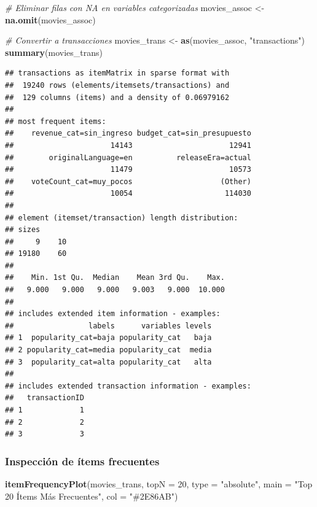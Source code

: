 \documentclass[
]{article}
\newenvironment{Shaded}{\begin{snugshade}}{\end{snugshade}}
\newcommand{\AttributeTok}[1]{\textcolor[rgb]{0.13,0.29,0.53}{#1}}
\newcommand{\CommentTok}[1]{\textcolor[rgb]{0.56,0.35,0.01}{\textit{#1}}}
\newcommand{\DecValTok}[1]{\textcolor[rgb]{0.00,0.00,0.81}{#1}}
\newcommand{\FunctionTok}[1]{\textcolor[rgb]{0.13,0.29,0.53}{\textbf{#1}}}
\newcommand{\NormalTok}[1]{#1}
\newcommand{\OtherTok}[1]{\textcolor[rgb]{0.56,0.35,0.01}{#1}}
\newcommand{\StringTok}[1]{\textcolor[rgb]{0.31,0.60,0.02}{#1}}
\begin{document}
\begin{Shaded}
\begin{Highlighting}[]
\CommentTok{\# Eliminar filas con NA en variables categorizadas}
\NormalTok{movies\_assoc }\OtherTok{\textless{}{-}} \FunctionTok{na.omit}\NormalTok{(movies\_assoc)}

\CommentTok{\# Convertir a transacciones}
\NormalTok{movies\_trans }\OtherTok{\textless{}{-}} \FunctionTok{as}\NormalTok{(movies\_assoc, }\StringTok{"transactions"}\NormalTok{)}
\FunctionTok{summary}\NormalTok{(movies\_trans)}
\end{Highlighting}
\end{Shaded}

\begin{verbatim}
## transactions as itemMatrix in sparse format with
##  19240 rows (elements/itemsets/transactions) and
##  129 columns (items) and a density of 0.06979162 
## 
## most frequent items:
##    revenue_cat=sin_ingreso budget_cat=sin_presupuesto 
##                      14143                      12941 
##        originalLanguage=en          releaseEra=actual 
##                      11479                      10573 
##    voteCount_cat=muy_pocos                    (Other) 
##                      10054                     114030 
## 
## element (itemset/transaction) length distribution:
## sizes
##     9    10 
## 19180    60 
## 
##    Min. 1st Qu.  Median    Mean 3rd Qu.    Max. 
##   9.000   9.000   9.000   9.003   9.000  10.000 
## 
## includes extended item information - examples:
##                 labels      variables levels
## 1  popularity_cat=baja popularity_cat   baja
## 2 popularity_cat=media popularity_cat  media
## 3  popularity_cat=alta popularity_cat   alta
## 
## includes extended transaction information - examples:
##   transactionID
## 1             1
## 2             2
## 3             3
\end{verbatim}

\subsubsection{Inspección de ítems
frecuentes}\label{inspecciuxf3n-de-uxedtems-frecuentes}

\begin{Shaded}
\begin{Highlighting}[]
\FunctionTok{itemFrequencyPlot}\NormalTok{(movies\_trans,}
                  \AttributeTok{topN =} \DecValTok{20}\NormalTok{,}
                  \AttributeTok{type =} \StringTok{"absolute"}\NormalTok{,}
                  \AttributeTok{main =} \StringTok{"Top 20 Ítems Más Frecuentes"}\NormalTok{,}
                  \AttributeTok{col =} \StringTok{"\#2E86AB"}\NormalTok{)}
\end{Highlighting}
\end{Shaded}
\end{document}
